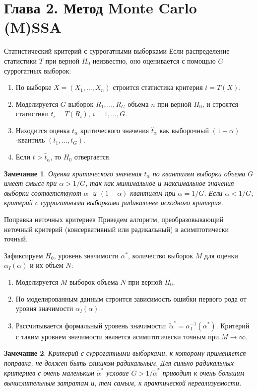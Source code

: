 \documentclass[pdf,notheorems,10pt,intlimits,unicode]{beamer}
\newtheorem{remark}{Замечание}
\begin{document}
\section{Глава 2. Метод Monte Carlo (M)SSA}
\begin{frame}{Статистический критерий с суррогатными выборками}
  Если распределение статистики $T$ при верной $H_0$ неизвестно, оно оценивается с помощью $G$ суррогатных выборок:
  \begin{enumerate}
    \item По выборке $X=(X_1,\ldots, X_n)$ строится статистика критерия $t=T(X)$.
    \item Моделируется $G$ выборок $R_1,\ldots, R_G$ объема $n$ при верной $H_0$, и строятся статистики $t_i=T(R_i)$, $i=1,\ldots, G$.
		\item Находится оценка $t_\alpha$ критического значения $\hat t_\alpha$ как выборочный $(1-\alpha)$-квантиль $(t_1,\ldots,t_G)$.
    \item Если $t>\hat t_\alpha$, то $H_0$ отвергается.
  \end{enumerate}

  \begin{remark}
    Оценка критического значения $t_\alpha$ по квантилям выборки объема $G$ имеет смысл при $\alpha>1/G$, так как минимальное и максимальное значения выборки соответствуют $\alpha$- и $(1-\alpha)$-квантилям при $\alpha = 1/G$. Если $\alpha < 1/G$, критерий с суррогатными выборками радикальнее исходного критерия.
  \end{remark}
\end{frame}

\begin{frame}{Поправка неточных критериев}
  Приведем алгоритм, преобразовывающий неточный критерий (консервативный или радикальный) в асимптотически точный.\medskip

  Зафиксируем $H_0$, уровень значимости $\alpha^*$, количество выборок $M$ для оценки $\alpha_I(\alpha)$ и их объем $N$:
  \begin{enumerate}
    \item Моделируется $M$ выборок объема $N$ при верной $H_0$.
    \item По моделированным данным строится зависимость ошибки первого рода от уровня значимости $\alpha_I(\alpha)$.
    \item Рассчитывается формальный уровень значимости: $\widetilde{\alpha}^*=\alpha_I^{-1}(\alpha^*)$. Критерий с таким уровнем значимости является асимптотически точным при $M\to\infty$.
   \end{enumerate}

  \begin{remark}
    Критерий с суррогатными выборками, к которому применяется поправка, не должен быть слишком радикальным. Для сильно радикальных критериев с очень маленьким $\widetilde\alpha^*$ условие $G > 1/\widetilde\alpha^*$ приводит к очень большим вычислительным затратам и, тем самым, к практической нереализуемости.
  \end{remark}
\end{frame}
\end{document}
